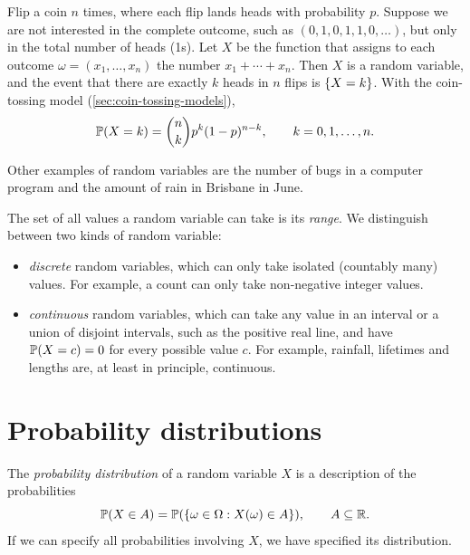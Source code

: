 \begin{example}\label{ex:number-of-heads}
Flip a coin $n$ times, where each flip lands heads with probability $p$. Suppose we are not interested in the complete outcome, such as $(0, 1, 0, 1, 1, 0, \ldots)$, but only in the total number of heads (1s). Let $X$ be the function that assigns to each outcome $\omega = (x_1, \ldots, x_n)$ the number $x_1 + \cdots + x_n$. Then $X$ is a random variable, and the event that there are exactly $k$ heads in $n$ flips is $\left\{ X = k \right\}$. With the coin-tossing model (\cref{sec:coin-tossing-models}),
\[
  \mathbb{P}(X = k) = \binom{n}{k} p^k (1 - p)^{n-k}, \qquad k = 0, 1, \ldots, n.
\]
\end{example}

Other examples of random variables are the number of bugs in a computer program and the amount of rain in Brisbane in June.

The set of all values a random variable can take is its \emph{range}. We distinguish between two kinds of random variable:
\begin{itemize}
  \item \emph{discrete} random variables, which can only take isolated (countably many) values. For example, a count can only take non-negative integer values.
  \item \emph{continuous} random variables, which can take any value in an interval or a union of disjoint intervals, such as the positive real line, and have $\mathbb{P}(X = c) = 0$ for every possible value $c$. For example, rainfall, lifetimes and lengths are, at least in principle, continuous.
\end{itemize}

\section{Probability distributions}\label{sec:distribution}

\begin{definition}\label{def:distribution}
The \emph{probability distribution} of a random variable $X$ is a description of the probabilities
\[
  \mathbb{P}(X \in A) = \mathbb{P}(\left\{ \omega \in \Omega : X(\omega) \in A \right\}), \qquad A \subseteq \mathbb{R}.
\]
If we can specify all probabilities involving $X$, we have specified its distribution.
\end{definition}

